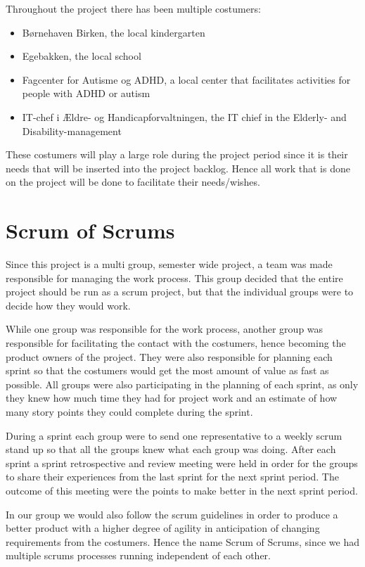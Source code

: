 Throughout the project there has been multiple costumers:

\begin{itemize}
	\item Børnehaven Birken, the local kindergarten
	\item Egebakken, the local school
	\item Fagcenter for Autisme og ADHD, a local center that facilitates activities for people with ADHD or autism
	\item IT-chef i Ældre- og Handicapforvaltningen, the IT chief in the Elderly- and Disability-management
\end{itemize}

These costumers will play a large role during the project period since it is their needs that will be inserted into the project backlog.
Hence all work that is done on the project will be done to facilitate their needs/wishes.

\section{Scrum of Scrums}
Since this project is a multi group, semester wide project, a team was made responsible for managing the work process.
This group decided that the entire project should be run as a scrum project, but that the individual groups were to decide how they would work.

While one group was responsible for the work process, another group was responsible for facilitating the contact with the costumers, hence becoming the product owners of the project.
They were also responsible for planning each sprint so that the costumers would get the most amount of value as fast as possible.
All groups were also participating in the planning of each sprint, as only they knew how much time they had for project work and an estimate of how many story points they could complete during the sprint.

During a sprint each group were to send one representative to a weekly scrum stand up so that all the groups knew what each group was doing.
After each sprint a sprint retrospective and review meeting were held in order for the groups to share their experiences from the last sprint for the next sprint period.
The outcome of this meeting were the points to make better in the next sprint period.

In our group we would also follow the scrum guidelines in order to produce a better product with a higher degree of agility in anticipation of changing requirements from the costumers.
Hence the name Scrum of Scrums, since we had multiple scrums processes running independent of each other.

